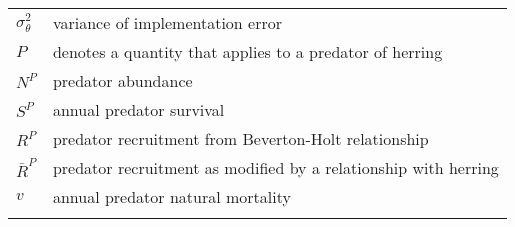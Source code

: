 \documentclass[]{article}
\begin{document}
\begin{longtable}[]{@{}ll@{}}
\begin{minipage}[t]{0.13\columnwidth}
\(\sigma_{\theta}^2\)\strut
\end{minipage} & \begin{minipage}[t]{0.76\columnwidth}\raggedright\strut
variance of implementation error\strut
\end{minipage}\tabularnewline
\begin{minipage}[t]{0.13\columnwidth}\raggedright\strut
\(P\)\strut
\end{minipage} & \begin{minipage}[t]{0.76\columnwidth}\raggedright\strut
denotes a quantity that applies to a predator of herring\strut
\end{minipage}\tabularnewline
\begin{minipage}[t]{0.13\columnwidth}\raggedright\strut
\(N^P\)\strut
\end{minipage} & \begin{minipage}[t]{0.76\columnwidth}\raggedright\strut
predator abundance\strut
\end{minipage}\tabularnewline
\begin{minipage}[t]{0.13\columnwidth}\raggedright\strut
\(S^P\)\strut
\end{minipage} & \begin{minipage}[t]{0.76\columnwidth}\raggedright\strut
annual predator survival\strut
\end{minipage}\tabularnewline
\begin{minipage}[t]{0.13\columnwidth}\raggedright\strut
\(R^P\)\strut
\end{minipage} & \begin{minipage}[t]{0.76\columnwidth}\raggedright\strut
predator recruitment from Beverton-Holt relationship\strut
\end{minipage}\tabularnewline
\begin{minipage}[t]{0.13\columnwidth}\raggedright\strut
\(\bar{R}^P\)\strut
\end{minipage} & \begin{minipage}[t]{0.76\columnwidth}\raggedright\strut
predator recruitment as modified by a relationship with herring\strut
\end{minipage}\tabularnewline
\begin{minipage}[t]{0.13\columnwidth}\raggedright\strut
\(v\)\strut
\end{minipage} & \begin{minipage}[t]{0.76\columnwidth}\raggedright\strut
annual predator natural mortality\strut
\end{minipage}\tabularnewline
\begin{minipage}[t]{0.13\columnwidth}\raggedright\strut

\end{minipage}
\end{longtable}
\end{document}
